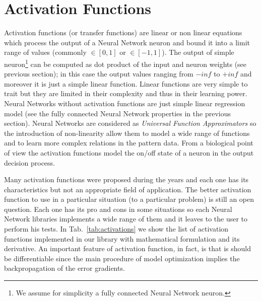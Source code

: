 \documentclass{standalone}
\begin{document}
\section[Activation functions]{Activation Functions}\label{activation}

Activation functions (or transfer functions) are linear or non linear equations which process the output of a Neural Network neuron and bound it into a limit range of values (commonly $\in[0, 1]$ or $\in[-1, 1]$).
The output of simple neuron\footnote{
  We assume for simplicity a fully connected Neural Network neuron.
} can be computed as dot product of the input and neuron weights (see previous section); in this case the output values ranging from $-inf$ to $+inf$ and moreover it is just a simple linear function.
Linear functions are very simple to trait but they are limited in their complexity and thus in their learning power.
Neural Networks without activation functions are just simple linear regression model (see the fully connected Neural Network properties in the previous section).
Neural Networks are considered as \emph{Universal Function Approximators} so the introduction of non-linearity allow them to model a wide range of functions and to learn more complex relations in the pattern data.
From a biological point of view the activation functions model the on/off state of a neuron in the output decision process.

Many activation functions were proposed during the years and each one has its characteristics but not an appropriate field of application.
The better activation function to use in a particular situation (to a particular problem) is still an open question.
Each one has its pro and cons in some situations so each Neural Network libraries implements a wide range of them and it leaves to the user to perform his tests.
In Tab.~\ref{tab:activations} we show the list of activation functions implemented in our library with mathematical formulation and its derivative.
An important feature of activation function, in fact, is that is should be differentiable since the main procedure of model optimization implies the backpropagation of the error gradients.
\end{document}
